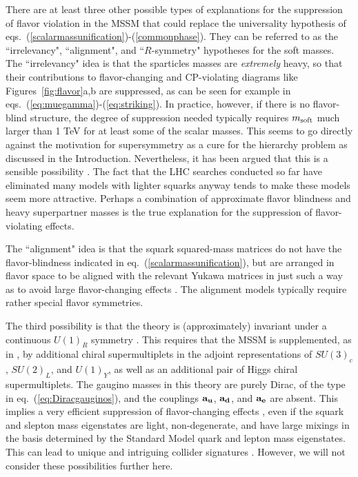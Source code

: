 \documentclass[12pt]{article}
\begin{document}
There are at least three other 
possible types of explanations for the suppression of flavor violation in 
the MSSM that could replace the universality hypothesis of 
eqs.~(\ref{scalarmassunification})-(\ref{commonphase}). They can be 
referred to as the ``irrelevancy", ``alignment", and ``$R$-symmetry" 
hypotheses for the soft masses. The ``irrelevancy" idea is that the 
sparticles masses are {\it extremely} heavy, so that their contributions 
to flavor-changing and CP-violating diagrams like 
Figures~\ref{fig:flavor}a,b are suppressed, as can be seen for example in 
eqs.~(\ref{eq:muegamma})-(\ref{eq:striking}).  In practice, however, 
if there is no flavor-blind structure, the 
degree of suppression needed typically requires $m_{\rm soft}$ much 
larger than 1 TeV for at least some of the scalar masses. This seems to 
go directly against the motivation for supersymmetry as a cure for the 
hierarchy problem as discussed in the Introduction. Nevertheless, it has 
been argued that this is a sensible possibility 
\cite{Moreminimal,splitsusy}. The fact that the LHC searches conducted so 
far have eliminated many models with lighter squarks anyway tends to make these 
models seem more attractive. Perhaps a combination of approximate flavor 
blindness and heavy superpartner masses is the true explanation 
for the suppression of flavor-violating effects.  

The ``alignment" idea is that the squark 
squared-mass matrices do not have the flavor-blindness indicated in 
eq.~(\ref{scalarmassunification}), but are arranged in flavor space to be 
aligned with the relevant Yukawa matrices in just such a way as to avoid 
large flavor-changing effects \cite{cterms,alignmentmodels}. The 
alignment models typically require rather special flavor symmetries. 

The third possibility is that the theory is (approximately) invariant under a 
continuous $U(1)_R$ symmetry \cite{Kribs:2007ac}. This requires that the 
MSSM is supplemented, as in \cite{Fox:2002bu}, by additional chiral 
supermultiplets in the adjoint representations of $SU(3)_c$, $SU(2)_L$, 
and $U(1)_Y$, as well as an additional pair of Higgs chiral 
supermultiplets. The gaugino masses in this theory are purely Dirac, of 
the type in eq.~(\ref{eq:Diracgauginos}), and the couplings $\bf a_u$, 
$\bf a_d$, and $\bf a_e$ are absent. This implies a very efficient 
suppression of flavor-changing effects 
\cite{Kribs:2007ac,Blechman:2008gu}, even if the squark and slepton mass 
eigenstates are light, non-degenerate, and have large mixings in the 
basis determined by the Standard Model quark and lepton mass eigenstates. 
This can lead to unique and intriguing collider signatures 
\cite{Kribs:2007ac,Plehn:2008ae}. However, we will not consider these 
possibilities further here.
\end{document}
